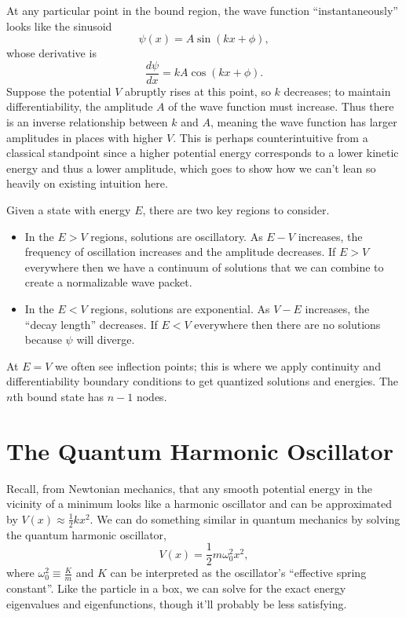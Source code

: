 \documentclass[../p052main.tex]{subfiles}
\begin{document}
At any particular point in the bound region, the wave function ``instantaneously'' looks like the sinusoid
\[ \psi(x) = A \sin (kx + \phi), \]
whose derivative is
\[ \frac{d\psi}{dx} = kA \cos (kx + \phi). \]
Suppose the potential $V$ abruptly rises at this point, so $k$ decreases; to maintain differentiability, the amplitude $A$ of the wave function must increase.
Thus there is an inverse relationship between $k$ and $A$, meaning the wave function has larger amplitudes in places with higher $V$.
This is perhaps counterintuitive from a classical standpoint since a higher potential energy corresponds to a lower kinetic energy and thus a lower amplitude, which goes to show how we can't lean so heavily on existing intuition here.

\begin{summary}
    Given a state with energy $E$, there are two key regions to consider.
    \begin{itemize}
        \item In the $E > V$ regions, solutions are oscillatory.
        As $E-V$ increases, the frequency of oscillation increases and the amplitude decreases.
        If $E > V$ everywhere then we have a continuum of solutions that we can combine to create a normalizable wave packet.
        \item In the $E < V$ regions, solutions are exponential.
        As $V-E$ increases, the ``decay length'' decreases.
        If $E < V$ everywhere then there are no solutions because $\psi$ will diverge.
    \end{itemize}
    At $E = V$ we often see inflection points; this is where we apply continuity and differentiability boundary conditions to get quantized solutions and energies.
    The $n$th bound state has $n-1$ nodes.
\end{summary}

\section{The Quantum Harmonic Oscillator}
Recall, from Newtonian mechanics, that any smooth potential energy in the vicinity of a minimum looks like a harmonic oscillator and can be approximated by $V(x) \approx \frac{1}{2} kx^2$.
We can do something similar in quantum mechanics by solving the quantum harmonic oscillator,
\[ V(x) = \frac{1}{2}m \omega_0^2 x^2, \]
where $\omega_0^2 \equiv \frac{K}{m}$ and $K$ can be interpreted as the oscillator's ``effective spring constant''.
Like the particle in a box, we can solve for the exact energy eigenvalues and eigenfunctions, though it'll probably be less satisfying.
\end{document}
